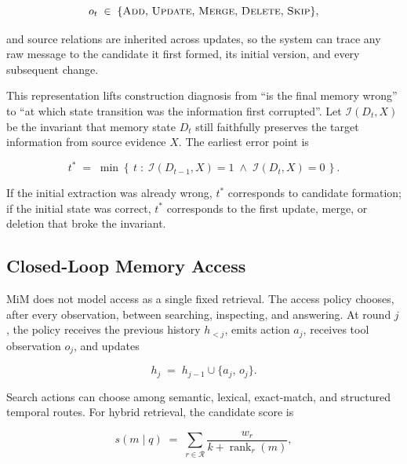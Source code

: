 \documentclass[11pt]{article}
\newcommand{\RR}{\mathcal{R}}
\DeclareMathOperator{\Rank}{rank}
\begin{document}
\begin{equation}
\label{eq:ops}
o_t \;\in\; \{\textsc{Add},\,\textsc{Update},\,\textsc{Merge},\,\textsc{Delete},\,\textsc{Skip}\},
\end{equation}

\noindent and source relations are inherited across updates, so the system can
trace any raw message to the candidate it first formed, its initial version, and
every subsequent change.

This representation lifts construction diagnosis from ``is the final memory
wrong'' to ``at which state transition was the information first corrupted''.
Let $\mathcal{I}(D_t, X)$ be the invariant that memory state $D_t$ still
faithfully preserves the target information from source evidence $X$. The
earliest error point is

\begin{equation}
\label{eq:tstar}
t^{*} \;=\; \min\left\{\, t \;:\;
\mathcal{I}(D_{t-1}, X) = 1 \;\land\; \mathcal{I}(D_t, X) = 0 \,\right\}.
\end{equation}

\noindent If the initial extraction was already wrong, $t^{*}$ corresponds to
candidate formation; if the initial state was correct, $t^{*}$ corresponds to
the first update, merge, or deletion that broke the invariant.

\subsection{Closed-Loop Memory Access}
\label{sec:method-access}

MiM does not model access as a single fixed retrieval. The access policy
chooses, after every observation, between searching, inspecting, and answering.
At round $j$, the policy receives the previous history $h_{<j}$, emits action
$a_j$, receives tool observation $o_j$, and updates

\begin{equation}
\label{eq:hist}
h_j \;=\; h_{j-1} \cup \{a_j,\,o_j\}.
\end{equation}

Search actions can choose among semantic, lexical, exact-match, and structured
temporal routes. For hybrid retrieval, the candidate score is

\begin{equation}
\label{eq:hybrid}
s(m \mid q) \;=\; \sum_{r \in \RR} \frac{w_r}{k + \Rank_r(m)},
\end{equation}
\end{document}
